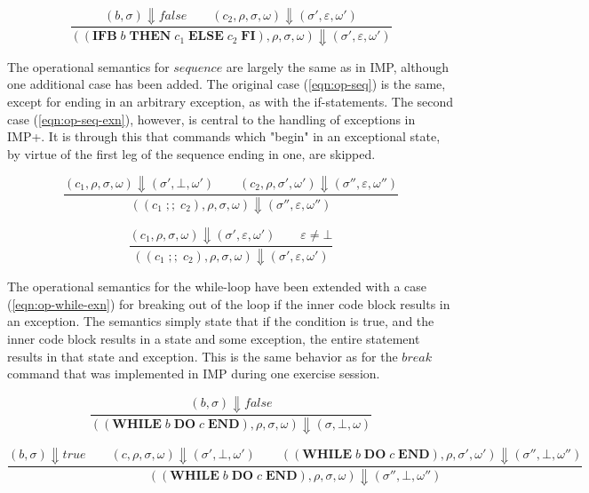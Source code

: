 \begin{equation}\label{eqn:op-if-false}
\frac{(b, \sigma) \Downarrow false \qquad (c_2, \rho, \sigma, \omega) \Downarrow (\sigma', \varepsilon, \omega')}{((\textbf{IFB}\; b\; \textbf{THEN}\; c_1\; \textbf{ELSE}\; c_2\; \textbf{FI}), \rho, \sigma, \omega) \Downarrow (\sigma', \varepsilon, \omega')}
\end{equation}

The operational semantics for $sequence$ are largely the same as in IMP, although one additional case has been added. The original case (\ref{eqn:op-seq}) is the same, except for ending in an arbitrary exception, as with the if-statements. The second case (\ref{eqn:op-seq-exn}), however, is central to the handling of exceptions in IMP+. It is through this that commands which "begin" in an exceptional state, by virtue of the first leg of the sequence ending in one, are skipped.

\begin{equation}\label{eqn:op-seq}
\frac{(c_1, \rho, \sigma, \omega) \Downarrow (\sigma', \bot, \omega') \qquad (c_2, \rho, \sigma', \omega') \Downarrow (\sigma'', \varepsilon, \omega'')}{((c_1\; ;;\; c_2), \rho, \sigma, \omega) \Downarrow (\sigma'', \varepsilon, \omega'')}
\end{equation}

\begin{equation}\label{eqn:op-seq-exn}
\frac{(c_1, \rho, \sigma, \omega) \Downarrow (\sigma', \varepsilon, \omega') \qquad \varepsilon \neq \bot}{((c_1\; ;;\; c_2), \rho, \sigma, \omega) \Downarrow (\sigma', \varepsilon, \omega')}
\end{equation}

The operational semantics for the while-loop have been extended with a case (\ref{eqn:op-while-exn}) for breaking out of the loop if the inner code block results in an exception. The semantics simply state that if the condition is true, and the inner code block results in a state and some exception, the entire statement results in that state and exception. This is the same behavior as for the $break$ command that was implemented in IMP during one exercise session.

\begin{equation}
\frac{(b, \sigma) \Downarrow false}{((\textbf{WHILE}\; b\; \textbf{DO}\; c\; \textbf{END}), \rho, \sigma, \omega) \Downarrow (\sigma, \bot, \omega)}
\end{equation}

\begin{equation}
\frac{(b, \sigma) \Downarrow true \qquad (c, \rho, \sigma, \omega) \Downarrow (\sigma', \bot, \omega') \qquad ((\textbf{WHILE}\; b\; \textbf{DO}\; c\; \textbf{END}), \rho, \sigma', \omega') \Downarrow (\sigma'', \bot, \omega'')}{((\textbf{WHILE}\; b\; \textbf{DO}\; c\; \textbf{END}), \rho, \sigma, \omega) \Downarrow (\sigma'', \bot, \omega'')}
\end{equation}

